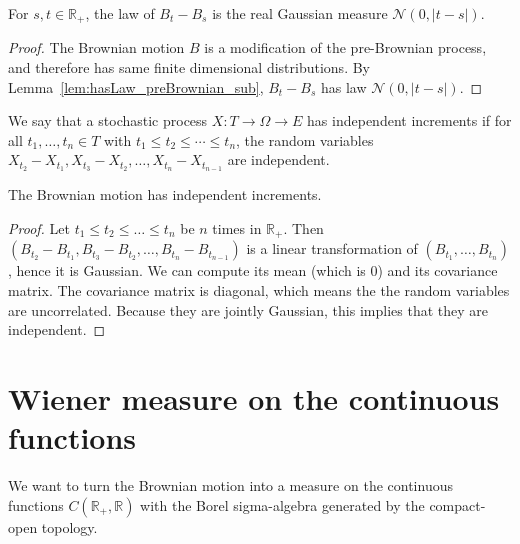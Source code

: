 \begin{lemma}\label{lem:hasLaw_brownian_sub}
  \leanok
For $s, t \in \mathbb{R}_+$, the law of $B_t - B_s$ is the real Gaussian measure $\mathcal{N}(0,\vert t - s \vert)$.
\end{lemma}

\begin{proof}\leanok
The Brownian motion $B$ is a modification of the pre-Brownian process, and therefore has same finite dimensional distributions. By Lemma~\ref{lem:hasLaw_preBrownian_sub}, $B_t - B_s$ has law $\mathcal{N}(0,\vert t - s \vert)$.
\end{proof}


\begin{definition}\label{def:HasIndepIncrements}
We say that a stochastic process $X : T \to \Omega \to E$ has independent increments if for all $t_1, \ldots, t_n \in T$ with $t_1 \le t_2 \le \cdots \le t_n$, the random variables $X_{t_2} - X_{t_1}, X_{t_3} - X_{t_2}, \ldots, X_{t_n} - X_{t_{n-1}}$ are independent.
\end{definition}


\begin{lemma}\label{lem:hasIndepIncrements_brownian}
  \leanok
The Brownian motion has independent increments.
\end{lemma}

\begin{proof}\leanok
Let $t_1 \le t_2 \le \ldots \le t_n$ be $n$ times in $\mathbb{R}_+$.
Then $(B_{t_2} - B_{t_1}, B_{t_3} - B_{t_2}, \ldots, B_{t_n} - B_{t_{n-1}})$ is a linear transformation of $(B_{t_1}, \ldots, B_{t_n})$, hence it is Gaussian.
We can compute its mean (which is $0$) and its covariance matrix.
The covariance matrix is diagonal, which means the the random variables are uncorrelated.
Because they are jointly Gaussian, this implies that they are independent.
\end{proof}


\section{Wiener measure on the continuous functions}

We want to turn the Brownian motion into a measure on the continuous functions $C(\mathbb{R}_+, \mathbb{R})$ with the Borel sigma-algebra generated by the compact-open topology.


